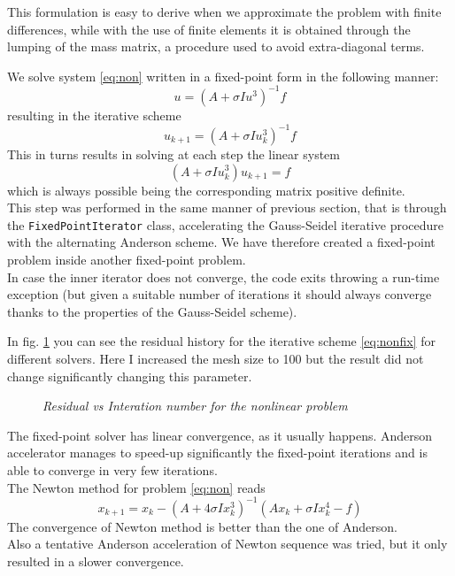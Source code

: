\documentclass[12pt]{article}
\begin{document}
			This formulation is easy to derive when we approximate the problem with finite differences, while
			with the use of finite elements it is obtained through the lumping of the mass matrix, a procedure
			used to avoid extra-diagonal terms.
			
			We solve system \ref{eq:non} written in a fixed-point form in the following manner:
			\begin{equation}
				u = (A+ \sigma I u^3)^{-1} f 
			\end{equation}
			resulting in the iterative scheme
			\begin{equation}
				\label{eq:nonfix}
				u_{k+1}= (A+ \sigma I u^3_k)^{-1} f 
			\end{equation}
			This in turns results in solving at each step the linear system
			\begin{equation}
				(A+ \sigma I u^3_k) u_{k+1} = f
			\end{equation}
			which is always possible being the corresponding matrix positive definite.\\
			This step was performed in the same manner of previous section, that is through the
			\verb|FixedPointIterator| class, accelerating the Gauss-Seidel iterative procedure
			with the alternating Anderson scheme.
			We have therefore created a fixed-point problem inside another fixed-point problem.\\
			In case the inner iterator does not converge, the code exits throwing a run-time
			exception (but given a suitable number of iterations it should always converge
			thanks to the properties of the Gauss-Seidel scheme).
			
			In fig. \ref{fig:nonlinear} you can see the residual history for the iterative scheme \ref{eq:nonfix}
			for different solvers. Here I increased the mesh size to 100 but the result did not change significantly
			changing this parameter.
			\begin{figure}
				{\scriptsize
			}
			\centering
			\caption{\textit{Residual vs Interation number for the nonlinear problem}}
			\label{fig:nonlinear}
			\end{figure}
			The fixed-point solver has linear convergence, as it usually happens.
			Anderson accelerator manages to speed-up significantly the fixed-point iterations and is able
			to converge in very few iterations.\\
			The Newton method for problem \ref{eq:non} reads
			\begin{equation}
				x_{k+1}= x_k - (A+4 \sigma I x_k^3)^{-1}(A x_k + \sigma I x_k^4 - f)
			\end{equation}
			The convergence of Newton method is better than the one of Anderson.\\
			Also a tentative Anderson acceleration of Newton sequence was tried,
			but it only resulted in a slower convergence.
						
\end{document}
